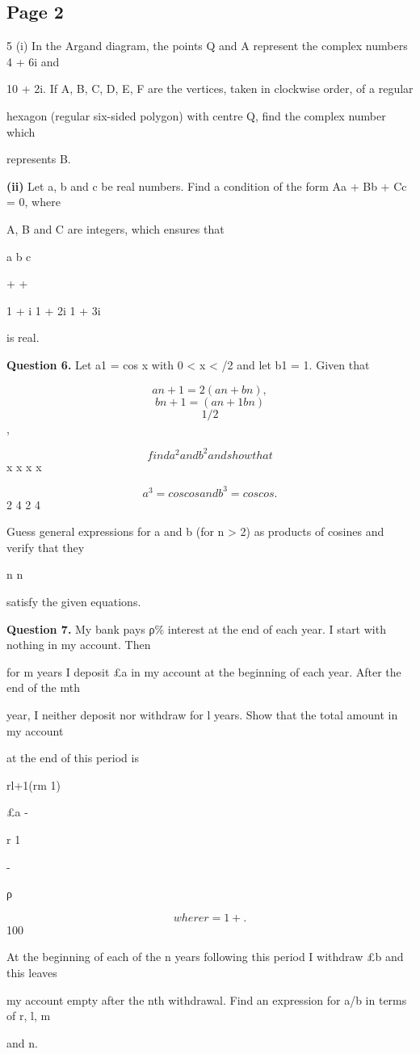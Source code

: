 \documentclass[12pt]{article}
\begin{document}
\subsection*{Page 2}
\begin{flushleft}
5 (i) In the Argand diagram, the points Q and A represent the complex numbers 4 + 6i and\par
10 + 2i. If A, B, C, D, E, F are the vertices, taken in clockwise order, of a regular\par
hexagon (regular six-sided polygon) with centre Q, find the complex number which\par
represents B.\par
\textbf{(ii)} Let a, b and c be real numbers. Find a condition of the form Aa + Bb + Cc = 0, where\par
A, B and C are integers, which ensures that\par
a b c\par
+ +\par
1 + i 1 + 2i 1 + 3i\par
is real.\par
\bigskip\textbf{Question 6.} Let a1 = cos x with 0 < x < \pi/2 and let b1 = 1. Given that\par
\[a n+1 = 2 (a n + b n ),\]
\[b n+1 = (a n+1b n )\]
\[1/2\]
,\par
\[find a^2 and b^2 and show that\]
x x x x\par
\[a^3 = cos cos and b^3 = cos cos .\]
2 4 2 4\par
Guess general expressions for a and b (for n > 2) as products of cosines and verify that they\par
n n\par
satisfy the given equations.\par
\bigskip\textbf{Question 7.} My bank pays ρ\% interest at the end of each year. I start with nothing in my account. Then\par
for m years I deposit \pounds a in my account at the beginning of each year. After the end of the mth\par
year, I neither deposit nor withdraw for l years. Show that the total amount in my account\par
at the end of this period is\par
rl+1(rm 1)\par
\pounds a -\par
r 1\par
-\par
ρ\par
\[where r = 1 + .\]
100\par
At the beginning of each of the n years following this period I withdraw \pounds b and this leaves\par
my account empty after the nth withdrawal. Find an expression for a/b in terms of r, l, m\par
and n.\par
\end{flushleft}
\end{document}
